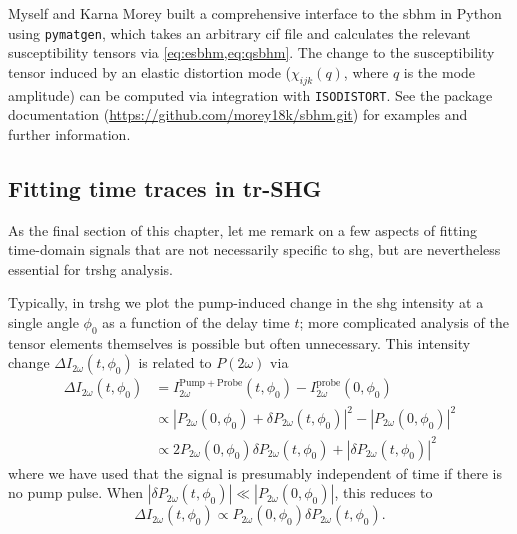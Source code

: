 Myself and Karna Morey built a comprehensive interface to the \gls{sbhm} in Python using \texttt{pymatgen}\citep{ong_python_2013}, which takes an arbitrary \gls{cif} file and calculates the relevant susceptibility tensors via \cref{eq:esbhm,eq:qsbhm}.
The change to the susceptibility tensor induced by an elastic distortion mode ($\chi_{ijk}(q)$, where $q$ is the mode amplitude) can be computed via integration with \texttt{ISODISTORT}\citep{isodistort, campbell_isodisplace_2006}.
See the package documentation (\url{https://github.com/morey18k/sbhm.git}) for examples and further information.

\subsection{Fitting time traces in tr-SHG}

As the final section of this chapter, let me remark on a few aspects of fitting time-domain signals that are not necessarily specific to \gls{shg}, but are nevertheless essential for \gls{trshg} analysis.

Typically, in \gls{trshg} we plot the pump-induced change in the \gls{shg} intensity at a single angle $\phi_0$ as a function of the delay time $t$; more complicated analysis of the tensor elements themselves is possible but often unnecessary.
This intensity change $\Delta I_{2\omega}(t, \phi_0)$ is related to $P(2\omega)$ via
\begin{align}
\Delta I_{2\omega}(t, \phi_0) &= I_{2\omega}^{\mathrm{Pump}+\mathrm{Probe}}(t, \phi_0)-I_{2\omega}^\mathrm{probe}(0, \phi_0)\\
&\propto |P_{2\omega}(0, \phi_0)+\delta P_{2\omega}(t, \phi_0)|^2 - |P_{2\omega}(0, \phi_0)|^2\\
&\propto 2P_{2\omega}(0, \phi_0)\delta P_{2\omega}(t, \phi_0) + |\delta P_{2\omega}(t, \phi_0)|^2
\end{align}
where we have used that the signal is presumably independent of time if there is no pump pulse.
When $|\delta P_{2\omega}(t, \phi_0)| \ll |P_{2\omega}(0, \phi_0)|$, this reduces to
\begin{equation}
\Delta I_{2\omega}(t, \phi_0) \propto P_{2\omega}(0, \phi_0)\delta P_{2\omega}(t, \phi_0).
\end{equation}

